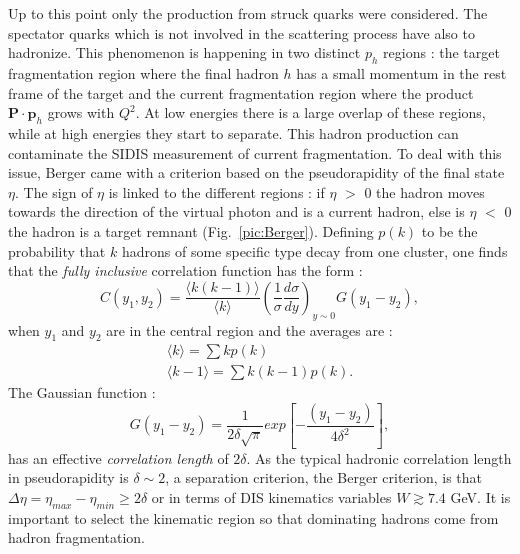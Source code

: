 Up to this point only the production from struck quarks were considered. The spectator quarks which is not involved in the scattering process have also to hadronize. This phenomenon is happening in two distinct $p_h$ regions : the target fragmentation region where the final hadron $h$ has a small momentum in the rest frame of the target and the current fragmentation region where the product $\textbf{P}\cdot\textbf{p}_h$ grows with $Q^2$. At low energies there is a large overlap of these regions, while at high energies they start to separate. This hadron production can contaminate the SIDIS measurement of current fragmentation. To deal with this issue, Berger \cite{BERGER} came with a criterion based on the pseudorapidity of the final state $\eta$. The sign of $\eta$ is linked to the different regions : if $\eta$ $>$ $0$ the hadron moves towards the direction of the virtual photon and is a current hadron, else is $\eta$ $<$ $0$ the hadron is a target remnant (Fig.~\ref{pic:Berger}). Defining $p(k)$ to be the probability that $k$ hadrons of some specific type decay from one cluster, one finds that the \textit{fully inclusive} correlation function has the form :
%
\begin{equation}
  C(y_1,y_2) = \frac{\langle k(k-1) \rangle}{\langle k \rangle} \left(\frac{1}{\sigma}\frac{d\sigma}{dy}\right)_{y\sim 0} G(y_1-y_2),
\end{equation}
%
when $y_1$ and $y_2$ are in the central region and the averages are :
%
\begin{equation}
  \begin{split}
    \langle k \rangle = \sum kp(k) \\
    \langle k-1 \rangle = \sum k(k-1)p(k).
  \end{split}
\end{equation}
%
The Gaussian function :
%
\begin{equation}
  G(y_1-y_2) = \frac{1}{2\delta \sqrt{\pi}}exp\left[-\frac{\left(y_1-y_2\right)}{4\delta^2}\right],
\end{equation}
%
has an effective \textit{correlation length} of $2\delta$. As the typical hadronic correlation length in pseudorapidity is $\delta \sim 2$, a separation criterion, the Berger criterion, is that $\Delta\eta = \eta_{max}-\eta_{min} \geq 2\delta$ or in terms of DIS kinematics variables $W \gtrsim 7.4$ GeV. It is important to select the kinematic region so that dominating hadrons come from hadron fragmentation.

